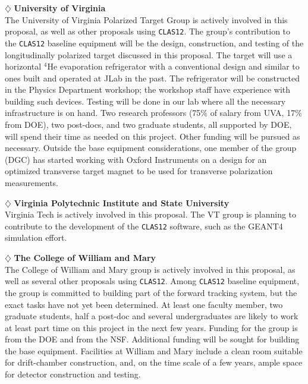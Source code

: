 \vskip 0.4cm

\noindent
$\diamondsuit$ {\bf University of Virginia} \\[0.2ex]

\noindent
The University of Virginia Polarized Target Group is actively involved in 
this proposal, as well as other proposals using {\tt CLAS12}.  The group's 
contribution to the {\tt CLAS12} baseline equipment will be the design, 
construction, and testing of the longitudinally polarized target discussed 
in this proposal.  The target will use a horizontal $^4$He evaporation 
refrigerator with a conventional design and similar to ones built and 
operated at JLab in the past.  The refrigerator will be constructed in the 
Physics Department workshop; the workshop staff have experience with 
building such devices.  Testing will be done in our lab where all the 
necessary infrastructure is on hand.  Two research professors (75\% of 
salary from UVA, 17\% from DOE), two post-docs, and two graduate students, 
all supported by DOE, will spend their time as needed on this project. 
Other funding will be pursued as necessary.  Outside the base equipment 
considerations, one member of the group (DGC) has started working with 
Oxford Instruments on a design for an optimized transverse target magnet to 
be used for transverse polarization measurements.

\vskip 0.4cm

\noindent
$\diamondsuit$ {\bf Virginia Polytechnic Institute and State University} \\[0.2ex]

\noindent
Virginia Tech is actively involved in this proposal.  The VT group is 
planning to contribute to the development of the {\tt CLAS12} software, such 
as the GEANT4 simulation effort.

\vskip 0.4cm

\noindent
$\diamondsuit$ {\bf The College of William and Mary} \\[0.2ex]

\noindent
The College of William and Mary group is actively involved in this proposal, 
as well as several other proposals using {\tt CLAS12}.  Among {\tt CLAS12} 
baseline equipment, the group is committed to building part of the forward 
tracking system, but the exact tasks have not yet been determined.  At least 
one faculty member, two graduate students, half a post-doc and several 
undergraduates are likely to work at least part time on this project in the 
next few years.  Funding for the group is from the DOE and from the NSF.
Additional funding will be sought for building the base equipment.
Facilities at William and Mary include a clean room suitable for drift-chamber
construction, and, on the time scale of a few years, ample space for detector 
construction and testing.

